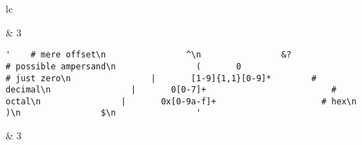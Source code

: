 \begin{table}
\begin{center}
\begin{tabular}{lc}
\begin{minipage}{2.4in}
\end{minipage}
& 3 \\ 
\midrule
\begin{minipage}{2.4in}
\begin{verbatim}
'    # mere offset\n                ^\n                &?                                          # possible ampersand\n                (       0                                       # just zero\n                |       [1-9]{1,1}[0-9]*        # decimal\n                |       0[0-7]+                         # octal\n                |       0x[0-9a-f]+                     # hex\n                )\n                $\n                '\end{verbatim}
\end{minipage}
& 3 \\ 
\bottomrule
\end{tabular}
\end{center}
\end{table}
